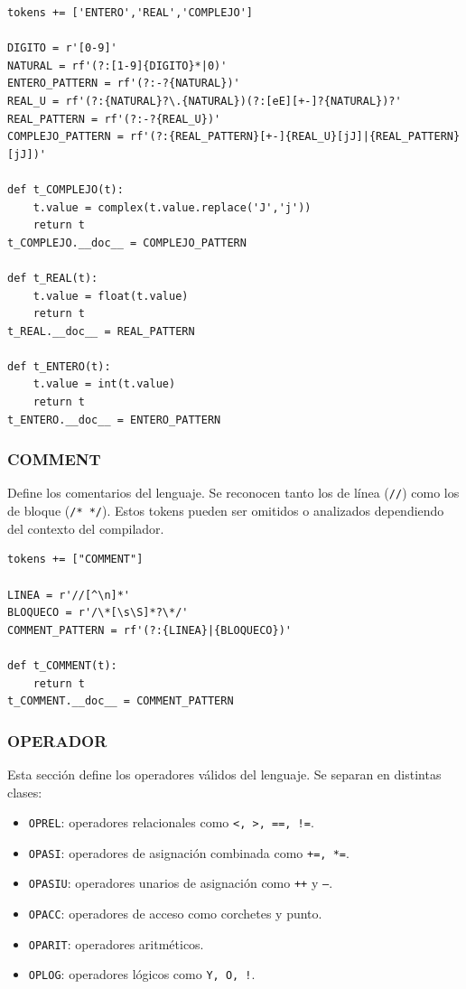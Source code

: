 \documentclass{article}
\begin{document}
\begin{lstlisting}[style=mypython]
tokens += ['ENTERO','REAL','COMPLEJO']

DIGITO = r'[0-9]'
NATURAL = rf'(?:[1-9]{DIGITO}*|0)'
ENTERO_PATTERN = rf'(?:-?{NATURAL})'
REAL_U = rf'(?:{NATURAL}?\.{NATURAL})(?:[eE][+-]?{NATURAL})?'
REAL_PATTERN = rf'(?:-?{REAL_U})'
COMPLEJO_PATTERN = rf'(?:{REAL_PATTERN}[+-]{REAL_U}[jJ]|{REAL_PATTERN}[jJ])'

def t_COMPLEJO(t):
    t.value = complex(t.value.replace('J','j'))
    return t
t_COMPLEJO.__doc__ = COMPLEJO_PATTERN

def t_REAL(t):
    t.value = float(t.value)
    return t
t_REAL.__doc__ = REAL_PATTERN

def t_ENTERO(t):
    t.value = int(t.value)
    return t
t_ENTERO.__doc__ = ENTERO_PATTERN
\end{lstlisting}

\subsubsection{COMMENT}
Define los comentarios del lenguaje. Se reconocen tanto los de línea (\texttt{//}) como los de bloque (\texttt{/* */}). Estos tokens pueden ser omitidos o analizados dependiendo del contexto del compilador.

\begin{lstlisting}[style=mypython]
tokens += ["COMMENT"]

LINEA = r'//[^\n]*'
BLOQUECO = r'/\*[\s\S]*?\*/'
COMMENT_PATTERN = rf'(?:{LINEA}|{BLOQUECO})'

def t_COMMENT(t):
    return t
t_COMMENT.__doc__ = COMMENT_PATTERN
\end{lstlisting}


\subsubsection{OPERADOR}

Esta sección define los operadores válidos del lenguaje. Se separan en distintas clases:

\begin{itemize}
  \item \texttt{OPREL}: operadores relacionales como \texttt{<, >, ==, !=}.
  \item \texttt{OPASI}: operadores de asignación combinada como \texttt{+=, *=}.
  \item \texttt{OPASIU}: operadores unarios de asignación como \texttt{++} y \texttt{--}.
  \item \texttt{OPACC}: operadores de acceso como corchetes y punto.
  \item \texttt{OPARIT}: operadores aritméticos.
  \item \texttt{OPLOG}: operadores lógicos como \texttt{Y, O, !}.
\end{itemize}
\end{document}
